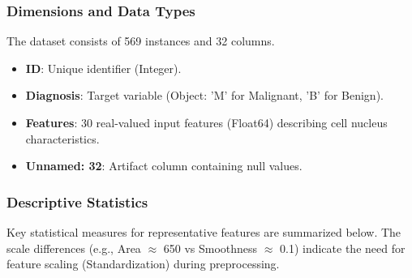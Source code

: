 \subsubsection{Dimensions and Data Types}
The dataset consists of 569 instances and 32 columns.
\begin{itemize}
    \item \textbf{ID}: Unique identifier (Integer).
    \item \textbf{Diagnosis}: Target variable (Object: 'M' for Malignant, 'B' for Benign).
    \item \textbf{Features}: 30 real-valued input features (Float64) describing cell nucleus characteristics.
    \item \textbf{Unnamed: 32}: Artifact column containing null values.
\end{itemize}

\subsubsection{Descriptive Statistics}
Key statistical measures for representative features are summarized below. The scale differences (e.g., Area $\approx$ 650 vs Smoothness $\approx$ 0.1) indicate the need for feature scaling (Standardization) during preprocessing.

